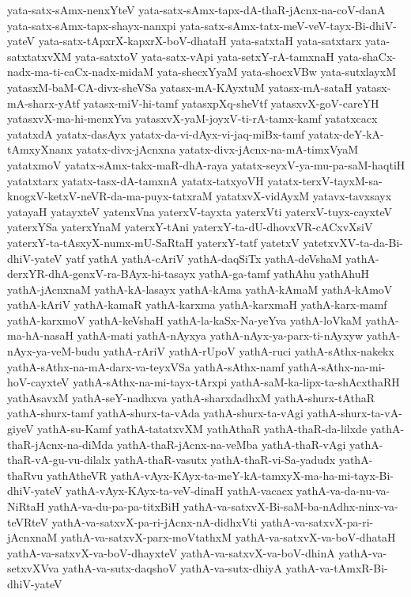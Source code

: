 {yata-satx-sAmx-nenxYteV
yata-satx-sAmx-tapx-dA-thaR-jAcnx-na-coV-danA
yata-satx-sAmx-tapx-shayx-nanxpi
yata-satx-sAmx-tatx-meV-veV-tayx-Bi-dhiV-yateV
yata-satx-tApxrX-kapxrX-boV-dhataH
yata-satxtaH
yata-satxtarx
yata-satxtatxvXM
yata-satxtoV
yata-satx-vApi
yata-setxY-rA-tamxnaH
yata-shaCx-nadx-ma-ti-caCx-nadx-midaM
yata-shecxYyaM
yata-shocxVBw
yata-sutxlayxM
yatasxM-baM-CA-divx-sheVSa
yatasx-mA-KAyxtuM
yatasx-mA-sataH
yatasx-mA-sharx-yAtf
yatasx-miV-hi-tamf
yatasxpXq-sheVtf
yatasxvX-goV-careYH
yatasxvX-ma-hi-menxYva
yatasxvX-yaM-joyxV-ti-rA-tamx-kamf
yatatxcacx
yatatxdA
yatatx-dasAyx
yatatx-da-vi-dAyx-vi-jaq-miBx-tamf
yatatx-deY-kA-tAmxyXnanx
yatatx-divx-jAcnxna
yatatx-divx-jAcnx-na-mA-timxVyaM
yatatxmoV
yatatx-sAmx-takx-maR-dhA-raya
yatatx-seyxV-ya-mu-pa-saM-haqtiH
yatatxtarx
yatatx-tasx-dA-tamxnA
yatatx-tatxyoVH
yatatx-terxV-tayxM-sa-knogxV-ketxV-neVR-da-ma-puyx-tatxraM
yatatxvX-vidAyxM
yatavx-tavxsayx
yatayaH
yatayxteV
yatenxVna
yaterxV-tayxta
yaterxVti
yaterxV-tuyx-cayxteV
yaterxYSa
yaterxYnaM
yaterxY-tAni
yaterxY-ta-dU-dhovxVR-cACxvXsiV
yaterxY-ta-tAsxyX-numx-mU-SaRtaH
yaterxY-tatf
yatetxV
yatetxvXV-ta-da-Bi-dhiV-yateV
yatf
yathA
yathA-cAriV
yathA-daqSiTx
yathA-deVshaM
yathA-derxYR-dhA-genxV-ra-BAyx-hi-tasayx
yathA-ga-tamf
yathAhu
yathAhuH
yathA-jAcnxnaM
yathA-kA-lasayx
yathA-kAma
yathA-kAmaM
yathA-kAmoV
yathA-kAriV
yathA-kamaR
yathA-karxma
yathA-karxmaH
yathA-karx-mamf
yathA-karxmoV
yathA-keVshaH
yathA-la-kaSx-Na-yeYva
yathA-loVkaM
yathA-ma-hA-nasaH
yathA-mati
yathA-nAyxya
yathA-nAyx-ya-parx-ti-nAyxyw
yathA-nAyx-ya-veM-budu
yathA-rAriV
yathA-rUpoV
yathA-ruci
yathA-sAthx-nakekx
yathA-sAthx-na-mA-darx-va-teyxVSa
yathA-sAthx-namf
yathA-sAthx-na-mi-hoV-cayxteV
yathA-sAthx-na-mi-tayx-tArxpi
yathA-saM-ka-lipx-ta-shAcxthaRH
yathAsavxM
yathA-seY-nadhxva
yathA-sharxdadhxM
yathA-shurx-tAthaR
yathA-shurx-tamf
yathA-shurx-ta-vAda
yathA-shurx-ta-vAgi
yathA-shurx-ta-vA-giyeV
yathA-su-Kamf
yathA-tatatxvXM
yathAthaR
yathA-thaR-da-lilxde
yathA-thaR-jAcnx-na-diMda
yathA-thaR-jAcnx-na-veMba
yathA-thaR-vAgi
yathA-thaR-vA-gu-vu-dilalx
yathA-thaR-vasutx
yathA-thaR-vi-Sa-yadudx
yathA-thaRvu
yathAtheVR
yathA-vAyx-KAyx-ta-meY-kA-tamxyX-ma-ha-mi-tayx-Bi-dhiV-yateV
yathA-vAyx-KAyx-ta-veV-dinaH
yathA-vacacx
yathA-va-da-nu-va-NiRtaH
yathA-va-du-pa-pa-titxBiH
yathA-va-satxvX-Bi-saM-ba-nAdhx-ninx-va-teVRteV
yathA-va-satxvX-pa-ri-jAcnx-nA-didhxVti
yathA-va-satxvX-pa-ri-jAcnxnaM
yathA-va-satxvX-parx-moVtathxM
yathA-va-satxvX-va-boV-dhataH
yathA-va-satxvX-va-boV-dhayxteV
yathA-va-satxvX-va-boV-dhinA
yathA-va-setxvXVva
yathA-va-sutx-daqshoV
yathA-va-sutx-dhiyA
yathA-va-tAmxR-Bi-dhiV-yateV
}
